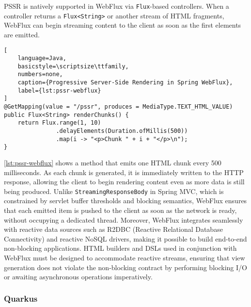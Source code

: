 PSSR is natively supported in WebFlux via \texttt{Flux}-based controllers. When
a controller returns a \texttt{Flux<String>} or another stream of HTML
fragments, WebFlux can begin streaming content to the client as soon as the
first elements are emitted.

\begin{lstlisting}[
    language=Java,
    basicstyle=\scriptsize\ttfamily,
    numbers=none,
    caption={Progressive Server-Side Rendering in Spring WebFlux},
    label={lst:pssr-webflux}
]
@GetMapping(value = "/pssr", produces = MediaType.TEXT_HTML_VALUE)
public Flux<String> renderChunks() {
    return Flux.range(1, 10)
               .delayElements(Duration.ofMillis(500))
               .map(i -> "<p>Chunk " + i + "</p>\n");
}
\end{lstlisting}

\autoref{lst:pssr-webflux} shows a method that emits one HTML chunk every 500 milliseconds. As
each chunk is generated, it is immediately written to the HTTP response,
allowing the client to begin rendering content even as more data is still being
produced. Unlike \texttt{StreamingResponseBody} in Spring MVC, which is
constrained by servlet buffer thresholds and blocking semantics, WebFlux
ensures that each emitted item is pushed to the client as soon as the network
is ready, without occupying a dedicated thread. Moreover, WebFlux integrates
seamlessly with reactive data sources such as R2DBC (Reactive Relational
Database Connectivity) and reactive NoSQL drivers, making it possible to build
end-to-end non-blocking applications. HTML builders and DSLs used in
conjunction with WebFlux must be designed to accommodate reactive streams,
ensuring that view generation does not violate the non-blocking contract by
performing blocking I/O or awaiting asynchronous operations imperatively.

\subsubsection{Quarkus}

